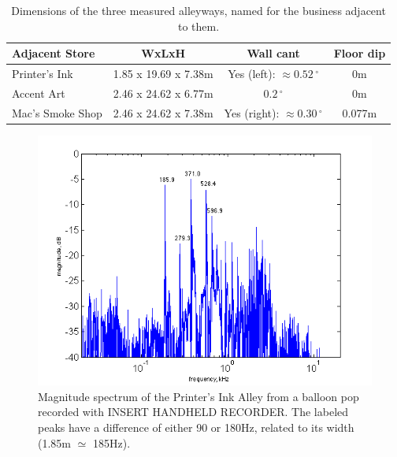 \documentclass{aes137}
\renewcommand{\deg}{\,^{\circ}}
\begin{document}
\begin{table}
\begin{center} 
\begin{tabular}{|l|c|c|c|}
\hline
\textbf{Adjacent Store} & \textbf{WxLxH} & \textbf{Wall cant} & \textbf{Floor dip} \\
\hline
Printer's Ink & 1.85 x 19.69 x 7.38m & Yes (left): $\approx0.52\deg$ & 0m \\
\hline
Accent Art & 2.46 x 24.62 x 6.77m & $0.2\deg$ & 0m \\
\hline
Mac's Smoke Shop & 2.46 x 24.62 x 7.38m & Yes (right): $\approx0.30\deg$ & 0.077m \\
\hline
\end{tabular} 
\caption{Dimensions of the three measured alleyways, named for the business adjacent to them.} 
\end{center}
\label{table:geometries}
\end{table}


\begin{figure}[h!] \centering \includegraphics[width=\linewidth]{images/printers_labeled_IR.png} 
\caption{Magnitude spectrum of the Printer's Ink Alley from
  a balloon pop recorded with INSERT HANDHELD RECORDER. The labeled
  peaks have a difference of either 90 or 180Hz, related to its width
  (1.85m $\simeq$ 185Hz).}
\end{figure}
\end{document}
